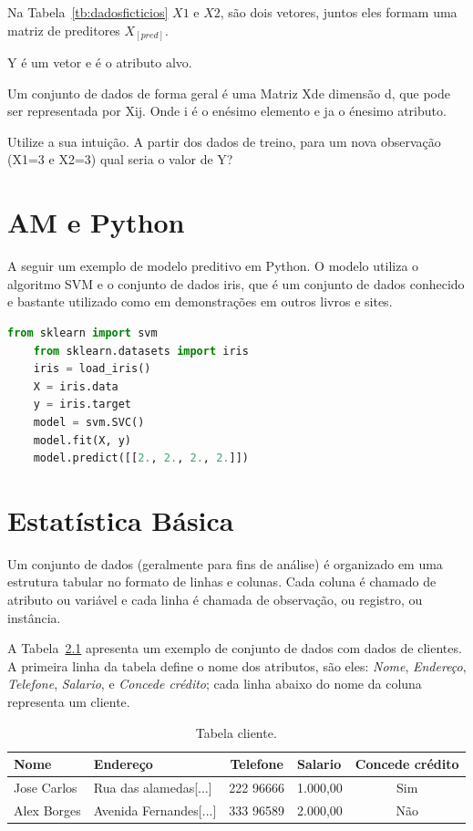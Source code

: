 \documentclass[a4paper,12pt]{book}
\begin{document}
Na Tabela~\ref{tb:dadosficticios} $X1$ e $X2$, são dois vetores, juntos eles formam uma matriz de preditores $X_[pred]$.

Y é um vetor e é o atributo alvo.

Um conjunto de dados de forma geral é uma Matriz Xde dimensão d, que pode ser representada por Xij. Onde i é o enésimo elemento e ja o énesimo atributo.

Utilize a sua intuição. A partir dos dados de treino, para um nova observação (X1=3 e X2=3) qual seria o valor de Y?




\chapter{AM e Python}

A seguir um exemplo de modelo preditivo em Python. O modelo utiliza o algoritmo SVM e o conjunto de dados iris, que é um conjunto de dados conhecido e bastante utilizado como em demonstrações em outros livros e sites.

\begin{lstlisting}[language=Python, caption={Exemplo de código que usa AM}]
	from sklearn import svm
	from sklearn.datasets import iris
	iris = load_iris()
	X = iris.data
	y = iris.target
	model = svm.SVC()
	model.fit(X, y)
	model.predict([[2., 2., 2., 2.]])
\end{lstlisting}

\chapter{Estatística Básica}

Um conjunto de dados (geralmente para fins de análise) é organizado em uma estrutura tabular no formato de linhas e colunas. Cada coluna é chamado de atributo ou variável e cada linha é chamada de observação, ou registro, ou instância.

A Tabela~\ref{tbl:cliente} apresenta um exemplo de conjunto de dados com dados de clientes. A primeira linha da tabela define o nome dos atributos, são eles: \textit{Nome}, \textit{Endereço}, \textit{Telefone}, \textit{Salario}, e \textit{Concede crédito}; cada linha abaixo do nome da coluna representa um cliente. %

\begin{table}
	\centering
	\caption{Tabela cliente.}
	\begin{tabular}{|l|l|c|l|c|}
	\hline
	\textbf{Nome} & \textbf{Endereço} & \textbf{Telefone} & \textbf{Salario} & \textbf{Concede crédito}\\
	\hline
	Jose Carlos & Rua das alamedas[...] & 222 96666 & 1.000,00 & Sim \\
	\hline
	Alex Borges & Avenida Fernandes[...]& 333 96589 & 2.000,00 & Não\\
	\hline
	\end{tabular}
	\label{tbl:cliente}
\end{table}
\end{document}
